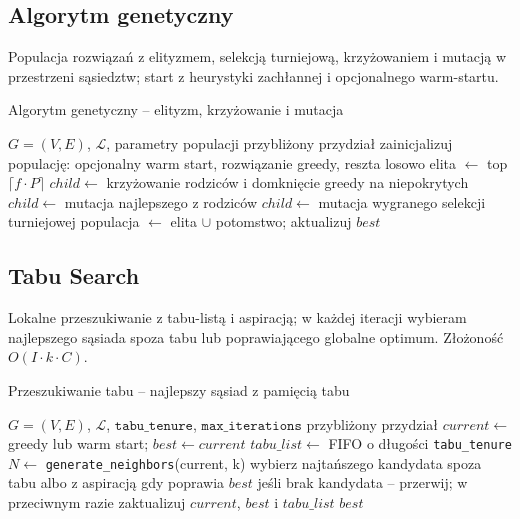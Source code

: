\subsection{Algorytm genetyczny}
Populacja rozwiązań z elityzmem, selekcją turniejową, krzyżowaniem i mutacją w przestrzeni sąsiedztw; start z heurystyki zachłannej i opcjonalnego warm-startu.

\begin{algorithm}[H]
\caption{Algorytm genetyczny – elityzm, krzyżowanie i mutacja}
\label{alg:ga}
\begin{algorithmic}[1]
\Require $G=(V,E)$, $\mathcal{L}$, parametry populacji
\Ensure przybliżony przydział
\State zainicjalizuj populację: opcjonalny warm start, rozwiązanie greedy, reszta losowo
  \State elita $\leftarrow$ top $\lceil f\cdot P\rceil$
      \State $child\gets$ krzyżowanie rodziców i domknięcie greedy na niepokrytych
       $child\gets$ mutacja najlepszego z rodziców
    \Else
      \State $child\gets$ mutacja wygranego selekcji turniejowej
    \EndIf
  \EndWhile
  \State populacja $\gets$ elita $\cup$ potomstwo; aktualizuj $best$
\EndFor
\end{algorithmic}
\end{algorithm}

\subsection{Tabu Search}
Lokalne przeszukiwanie z tabu-listą i aspiracją; w każdej iteracji wybieram najlepszego sąsiada spoza tabu lub poprawiającego globalne optimum. Złożoność $O(I\cdot k\cdot C)$.

\begin{algorithm}[H]
\caption{Przeszukiwanie tabu – najlepszy sąsiad z pamięcią tabu}
\label{alg:tabu}
\begin{algorithmic}[1]
\Require $G=(V,E)$, $\mathcal{L}$, $\texttt{tabu\_tenure}$, $\texttt{max\_iterations}$
\Ensure przybliżony przydział
\State $current\gets$ greedy lub warm start; $best\gets current$
\State $tabu\_list\gets$ FIFO o długości \texttt{tabu\_tenure}
  \State $N\gets$ \texttt{generate\_neighbors}(current, k)
  \State wybierz najtańszego kandydata spoza tabu albo z aspiracją gdy poprawia $best$
  \State jeśli brak kandydata – przerwij; w przeciwnym razie zaktualizuj $current$, $best$ i $tabu\_list$
\EndFor
\State \Return $best$
\end{algorithmic}
\end{algorithm}

